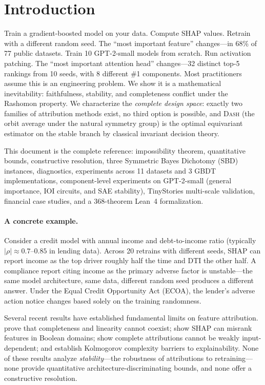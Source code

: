 \documentclass{article}
\newcommand{\DASH}{\textsc{Dash}}
\begin{document}

\section{Introduction}
\label{sec:intro}

Train a gradient-boosted model on your data. Compute SHAP values. Retrain with a different random seed. The ``most important feature'' changes---in 68\% of 77 public datasets. Train 10 GPT-2-small models from scratch. Run activation patching. The ``most important attention head'' changes---32 distinct top-5 rankings from 10 seeds, with 8 different \#1 components. Most practitioners assume this is an engineering problem. We show it is a mathematical inevitability: faithfulness, stability, and completeness conflict under the Rashomon property. We characterize the \emph{complete design space}: exactly two families of attribution methods exist, no third option is possible, and \DASH{} (the orbit average under the natural symmetry group) is the optimal equivariant estimator on the stable branch by classical invariant decision theory.

This document is the complete reference: impossibility theorem, quantitative bounds, constructive resolution, three Symmetric Bayes Dichotomy (SBD) instances, diagnostics, experiments across 11 datasets and 3 GBDT implementations, component-level experiments on GPT-2-small (general importance, IOI circuits, and SAE stability), TinyStories multi-scale validation, financial case studies, and a 368-theorem Lean~4 formalization.

\paragraph{A concrete example.}
Consider a credit model with annual income and debt-to-income ratio
(typically $|\rho| \approx 0.7$--$0.85$ in lending data). Across 20 retrains with different seeds, SHAP
can report income as the top driver roughly half the time and DTI the other half.
A compliance report citing income as the primary adverse factor
is unstable---the same model architecture, same data, different
random seed produces a different answer. Under the Equal Credit Opportunity Act (ECOA), the lender's adverse action notice
changes based solely on the training randomness.

\begin{sloppypar}
Several recent results have established fundamental limits on feature attribution.
\citet{bilodeau2024impossibility} prove that completeness and linearity cannot coexist;
\citet{huang2024failings} show SHAP can misrank features in Boolean domains;
\citet{srinivas2019full} show complete attributions cannot be weakly input-dependent;
and \citet{rao2025limits} establish Kolmogorov complexity barriers to explainability.
None of these results analyze \emph{stability}---the robustness of attributions to
retraining---none provide quantitative architecture-discriminating bounds, and none
offer a constructive resolution.
\end{sloppypar}
\end{document}
